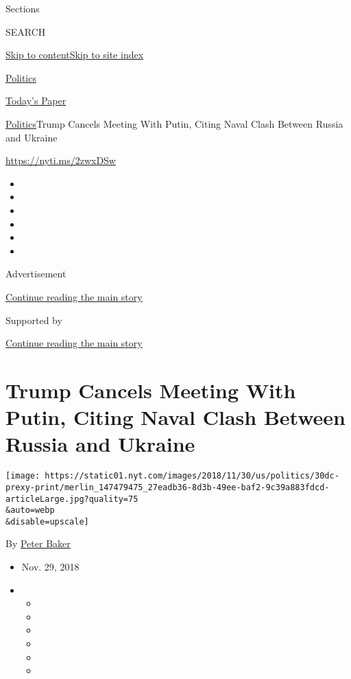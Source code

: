 Sections

SEARCH

\protect\hyperlink{site-content}{Skip to
content}\protect\hyperlink{site-index}{Skip to site index}

\href{https://www.nytimes.com/section/politics}{Politics}

\href{https://myaccount.nytimes.com/auth/login?response_type=cookie\&client_id=vi}{}

\href{https://www.nytimes.com/section/todayspaper}{Today's Paper}

\href{/section/politics}{Politics}\textbar{}Trump Cancels Meeting With
Putin, Citing Naval Clash Between Russia and Ukraine

\url{https://nyti.ms/2zwxDSw}

\begin{itemize}
\item
\item
\item
\item
\item
\item
\end{itemize}

Advertisement

\protect\hyperlink{after-top}{Continue reading the main story}

Supported by

\protect\hyperlink{after-sponsor}{Continue reading the main story}

\hypertarget{trump-cancels-meeting-with-putin-citing-naval-clash-between-russia-and-ukraine}{%
\section{Trump Cancels Meeting With Putin, Citing Naval Clash Between
Russia and
Ukraine}\label{trump-cancels-meeting-with-putin-citing-naval-clash-between-russia-and-ukraine}}

\texttt{[image: https://static01.nyt.com/images/2018/11/30/us/politics/30dc-prexy-print/merlin\_147479475\_27eadb36-8d3b-49ee-baf2-9c39a883fdcd-articleLarge.jpg?quality=75\\\&auto=webp\\\&disable=upscale]}

By \href{https://www.nytimes.com/by/peter-baker}{Peter Baker}

\begin{itemize}
\item
  Nov. 29, 2018
\item
  \begin{itemize}
  \item
  \item
  \item
  \item
  \item
  \item
  \end{itemize}
\end{itemize}

